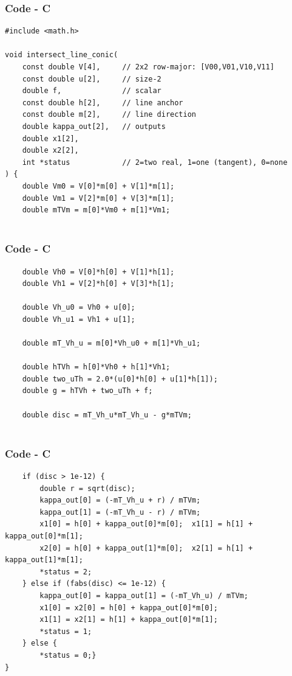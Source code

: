 \documentclass{beamer}
\theoremstyle{remark}
\numberwithin{equation}{section}
\begin{document}
\begin{frame}[fragile]
    \frametitle{Code - C}
    \begin{lstlisting}
#include <math.h>

void intersect_line_conic(
    const double V[4],     // 2x2 row-major: [V00,V01,V10,V11]
    const double u[2],     // size-2
    double f,              // scalar
    const double h[2],     // line anchor
    const double m[2],     // line direction
    double kappa_out[2],   // outputs
    double x1[2],
    double x2[2],
    int *status            // 2=two real, 1=one (tangent), 0=none
) {
    double Vm0 = V[0]*m[0] + V[1]*m[1];
    double Vm1 = V[2]*m[0] + V[3]*m[1];
    double mTVm = m[0]*Vm0 + m[1]*Vm1;


    \end{lstlisting}
    \end{frame}

    \begin{frame}[fragile]
    \frametitle{Code - C}
    \begin{lstlisting}
    double Vh0 = V[0]*h[0] + V[1]*h[1];
    double Vh1 = V[2]*h[0] + V[3]*h[1];

    double Vh_u0 = Vh0 + u[0];
    double Vh_u1 = Vh1 + u[1];

    double mT_Vh_u = m[0]*Vh_u0 + m[1]*Vh_u1;

    double hTVh = h[0]*Vh0 + h[1]*Vh1;
    double two_uTh = 2.0*(u[0]*h[0] + u[1]*h[1]);
    double g = hTVh + two_uTh + f;

    double disc = mT_Vh_u*mT_Vh_u - g*mTVm;


    \end{lstlisting}
    \end{frame}

        \begin{frame}[fragile]
    \frametitle{Code - C}
    \begin{lstlisting}
    if (disc > 1e-12) {
        double r = sqrt(disc);
        kappa_out[0] = (-mT_Vh_u + r) / mTVm;
        kappa_out[1] = (-mT_Vh_u - r) / mTVm;
        x1[0] = h[0] + kappa_out[0]*m[0];  x1[1] = h[1] + kappa_out[0]*m[1];
        x2[0] = h[0] + kappa_out[1]*m[0];  x2[1] = h[1] + kappa_out[1]*m[1];
        *status = 2;
    } else if (fabs(disc) <= 1e-12) {
        kappa_out[0] = kappa_out[1] = (-mT_Vh_u) / mTVm;
        x1[0] = x2[0] = h[0] + kappa_out[0]*m[0];
        x1[1] = x2[1] = h[1] + kappa_out[0]*m[1];
        *status = 1;
    } else {
        *status = 0;}
}


    \end{lstlisting}
    \end{frame}
\end{document}
